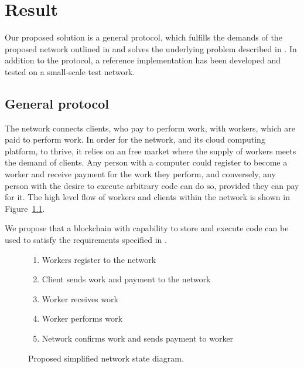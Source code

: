 \chapter{Result}
Our proposed solution is a general protocol, which fulfills the demands of the proposed network outlined in  and solves the underlying problem described in .
In addition to the protocol, a reference implementation has been developed and tested on a small-scale test network.

\section{General protocol}
\label{sec:res:protocol}
The network connects clients, who pay to perform work, with workers, which are paid to perform work. In order for the network, and its cloud computing platform, to thrive, it relies on an free market where the supply of workers meets the demand of clients. Any person with a computer could register to become a worker and receive payment for the work they perform, and conversely, any person with the desire to execute arbitrary code can do so, provided they can pay for it. The high level flow of workers and clients within the network is shown in Figure~\ref{network-schema}.

We propose that a blockchain with capability to store and execute code can be used to satisfy the requirements specified in .

\begin{figure}[ht]
\centering
{}

\begin{enumerate}
\item Workers register to the network
\item Client sends work and payment to the network
\item Worker receives work
\item Worker performs work
\item Network confirms work and sends payment to worker
\end{enumerate}
\caption{Proposed simplified network state diagram.}
\label{network-schema}
\end{figure}


